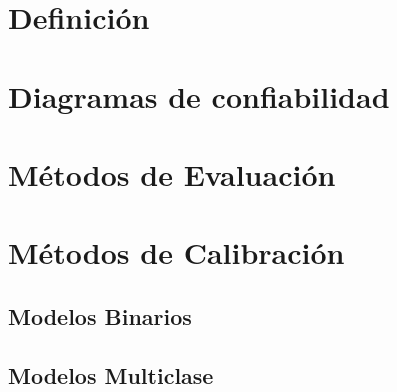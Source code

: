 \section{Definición}

\section{Diagramas de confiabilidad}

\section{Métodos de Evaluación}

\section{Métodos de Calibración}

\subsection{Modelos Binarios}

\subsection{Modelos Multiclase}